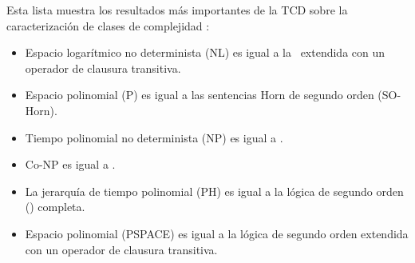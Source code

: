 Esta lista muestra los resultados más importantes de la TCD sobre la
caracterización de clases de complejidad \cite{immerman:book}:
\begin{itemize}
\item Espacio logarítmico no determinista (NL) es igual a la \LPO\ extendida con
un operador de clausura transitiva.
\item Espacio polinomial (P) es igual a las sentencias Horn de segundo orden
(SO-Horn).
\item Tiempo polinomial no determinista (NP) es igual a \SOE.
\item Co-NP es igual a \SOA.
\item La jerarquía de tiempo polinomial (PH) es igual a la lógica 
de segundo orden (\LSO) completa.
\item Espacio polinomial (PSPACE) es igual a la lógica de segundo orden
extendida con un operador de clausura transitiva.
\end{itemize}


%
%


